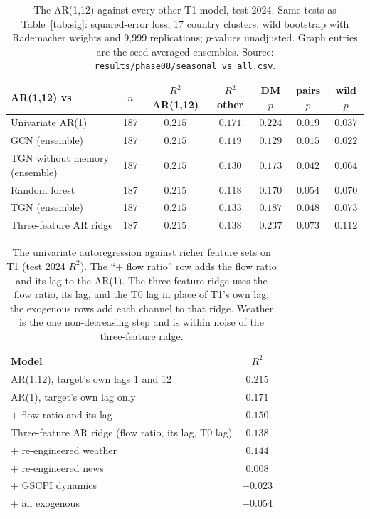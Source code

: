 \documentclass[10pt]{article}
\begin{document}
\begin{table}[t]
\centering
\caption{The AR(1,12) against every other T1 model, test 2024. Same tests as Table~\ref{tab:sig}: squared-error loss, 17 country clusters, wild bootstrap with Rademacher weights and 9{,}999 replications; $p$-values unadjusted. Graph entries are the seed-averaged ensembles. Source: \texttt{results/phase08/seasonal\_vs\_all.csv}.}
\label{tab:seasonal}
\scriptsize
\begin{tabular}{l c cc ccc}
\toprule
\textbf{AR(1,12) vs} & \textbf{$n$} & \textbf{$R^2$ AR(1,12)} & \textbf{$R^2$ other} & \textbf{DM $p$} & \textbf{pairs $p$} & \textbf{wild $p$} \\
\midrule
Univariate AR(1) & 187 & $0.215$ & $0.171$ & $0.224$ & $0.019$ & $0.037$ \\
GCN (ensemble) & 187 & $0.215$ & $0.119$ & $0.129$ & $0.015$ & $0.022$ \\
TGN without memory (ensemble) & 187 & $0.215$ & $0.130$ & $0.173$ & $0.042$ & $0.064$ \\
Random forest & 187 & $0.215$ & $0.118$ & $0.170$ & $0.054$ & $0.070$ \\
TGN (ensemble) & 187 & $0.215$ & $0.133$ & $0.187$ & $0.048$ & $0.073$ \\
Three-feature AR ridge & 187 & $0.215$ & $0.138$ & $0.237$ & $0.073$ & $0.112$ \\
\bottomrule
\end{tabular}
\end{table}

\begin{table}[t]
\centering
\caption{The univariate autoregression against richer feature sets on T1 (test 2024 $R^2$). The ``+ flow ratio'' row adds the flow ratio and its lag to the AR(1). The three-feature ridge uses the flow ratio, its lag, and the T0 lag in place of T1's own lag; the exogenous rows add each channel to that ridge. Weather is the one non-decreasing step and is within noise of the three-feature ridge.}
\label{tab:degrade}
\footnotesize
\begin{tabular}{lc}
\toprule
\textbf{Model} & \textbf{$R^2$} \\
\midrule
AR(1,12), target's own lags 1 and 12 & $0.215$ \\
AR(1), target's own lag only & $0.171$ \\
{}+ flow ratio and its lag & $0.150$ \\
Three-feature AR ridge (flow ratio, its lag, T0 lag) & $0.138$ \\
{}+ re-engineered weather & $0.144$ \\
{}+ re-engineered news & $0.008$ \\
{}+ GSCPI dynamics & $-0.023$ \\
{}+ all exogenous & $-0.054$ \\
\bottomrule
\end{tabular}
\end{table}
\end{document}
